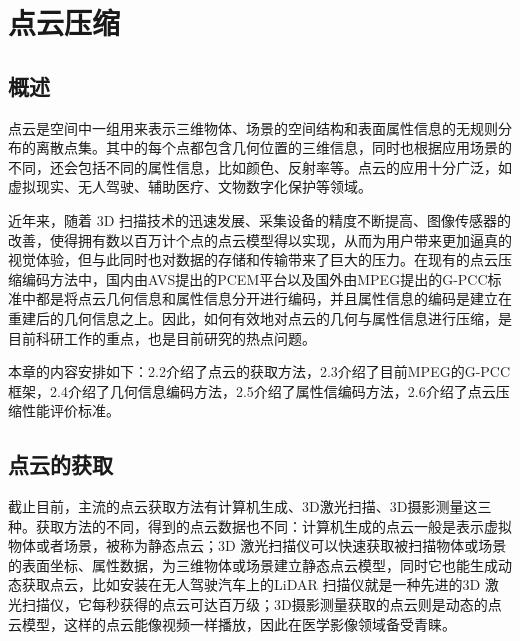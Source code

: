 \documentclass[bachelor,print,msfonts]{xduthesis}
\begin{document}
\mainmatter
\fi
\chapter{点云压缩}
\section{概述}
点云是空间中一组用来表示三维物体、场景的空间结构和表面属性信息的无规则分布的离散点集。其中的每个点都包含几何位置的三维信息，同时也根据应用场景的不同，还会包括不同的属性信息，比如颜色、反射率等。点云的应用十分广泛，如虚拟现实\cite{ref15}、无人驾驶、辅助医疗\cite{ref14}、文物数字化保护等领域。

近年来，随着 3D 扫描技术的迅速发展、采集设备的精度不断提高、图像传感器的改善，使得拥有数以百万计个点的点云模型得以实现，从而为用户带来更加逼真的视觉体验，但与此同时也对数据的存储和传输带来了巨大的压力。在现有的点云压缩编码方法中，国内由AVS提出的PCEM平台以及国外由MPEG提出的G-PCC标准中都是将点云几何信息和属性信息分开进行编码，并且属性信息的编码是建立在重建后的几何信息之上。因此，如何有效地对点云的几何与属性信息进行压缩，是目前科研工作的重点，也是目前研究的热点问题\cite{ref4}。

本章的内容安排如下：2.2介绍了点云的获取方法，2.3介绍了目前MPEG的G-PCC框架\cite{ref12}，2.4介绍了几何信息编码方法，2.5介绍了属性信编码方法，2.6介绍了点云压缩性能评价标准。

\section{点云的获取}
截止目前，主流的点云获取方法有计算机生成、3D激光扫描、3D摄影测量这三种。获取方法的不同，得到的点云数据也不同：计算机生成的点云一般是表示虚拟物体或者场景，被称为静态点云；3D 激光扫描仪可以快速获取被扫描物体或场景的表面坐标、属性数据，为三维物体或场景建立静态点云模型，同时它也能生成动态获取点云，比如安装在无人驾驶汽车上的LiDAR 扫描仪就是一种先进的3D 激光扫描仪，它每秒获得的点云可达百万级；3D摄影测量获取的点云则是动态的点云模型，这样的点云能像视频一样播放，因此在医学影像领域备受青睐。
\end{document}
